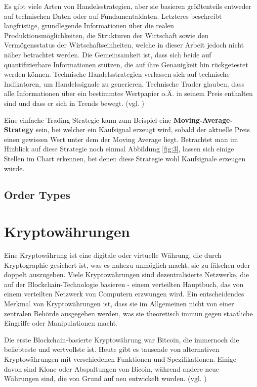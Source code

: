\documentclass[oneside]{ausarbeitung}
\begin{document}
Es gibt viele Arten von Handelsstrategien, aber sie basieren größtenteils entweder auf technischen Daten oder auf Fundamentaldaten. Letzteres beschreibt langfristige, grundlegende Informationen über die realen Produktionsmöglichkeiten, die Strukturen der Wirtschaft sowie den Vermögensstatus der Wirtschaftseinheiten, welche in dieser Arbeit jedoch nicht näher betrachtet werden\cite{fundamentaldaten}. Die Gemeinsamkeit ist, dass sich beide auf quantifizierbare Informationen stützen, die auf ihre Genauigkeit hin rückgetestet werden können.
Technische Handelsstrategien verlassen sich auf technische Indikatoren, um Handelssignale zu generieren. Technische Trader glauben, dass alle Informationen über ein bestimmtes Wertpapier o.Ä. in seinem Preis enthalten sind und dass er sich in Trends bewegt. (vgl. \cite{trading_strategy}) 

Eine einfache Trading Strategie kann zum Beispiel eine \textbf{Moving-Average-Strategy} sein, bei welcher ein Kaufsignal erzeugt wird, sobald der aktuelle Preis einen gewissen Wert unter dem der Moving Average liegt. Betrachtet man im Hinblick auf diese Strategie noch einmal Abbildung \ref{fig:3}, lassen sich einige Stellen im Chart erkennen, bei denen diese Strategie wohl Kaufsignale erzeugen würde.

\subsection{Order Types}
\label{sub:order_types}


\section{Kryptowährungen}
\label{sec:kryptowährungen}

Eine Kryptowährung ist eine digitale oder virtuelle Währung, die durch Kryptographie gesichert ist, was es nahezu unmöglich macht, sie zu fälschen oder doppelt auszugeben. Viele Kryptowährungen sind dezentralisierte Netzwerke, die auf der Blockchain-Technologie basieren - einem verteilten Hauptbuch, das von einem verteilten Netzwerk von Computern erzwungen wird. Ein entscheidendes Merkmal von Kryptowährungen ist, dass sie im Allgemeinen nicht von einer zentralen Behörde ausgegeben werden, was sie theoretisch immun gegen staatliche Eingriffe oder Manipulationen macht.

Die erste Blockchain-basierte Kryptowährung war Bitcoin, die immernoch die beliebteste und wertvollste ist. Heute gibt es tausende von alternativen Kryptowährungen mit verschiedenen Funktionen und Spezifikationen. Einige davon sind Klone oder Abspaltungen von Bicoin, während andere neue Währungen sind, die von Grund auf neu entwickelt wurden. (vgl. \cite{cryptocurrency_explained})
\end{document}
